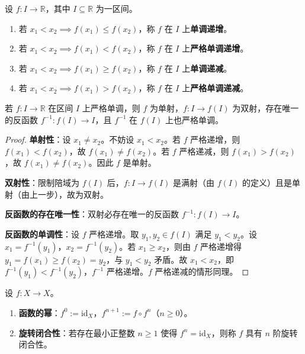 \begin{definition}\label{def:monotonicity}
设 $f: I \to \mathbb{R}$，其中 $I \subseteq \mathbb{R}$ 为一区间。
\begin{enumerate}[label=(\roman*)]
    \item 若 $x_1 < x_2 \implies f(x_1) \le f(x_2)$，称 $f$ 在 $I$ 上\textbf{单调递增}。
    \item 若 $x_1 < x_2 \implies f(x_1) < f(x_2)$，称 $f$ 在 $I$ 上\textbf{严格单调递增}。
    \item 若 $x_1 < x_2 \implies f(x_1) \ge f(x_2)$，称 $f$ 在 $I$ 上\textbf{单调递减}。
    \item 若 $x_1 < x_2 \implies f(x_1) > f(x_2)$，称 $f$ 在 $I$ 上\textbf{严格单调递减}。
\end{enumerate}
\end{definition}

\begin{proposition}[严格单调函数的反函数存在性]\label{prop:strict_monotone_inverse}
若 $f: I \to \mathbb{R}$ 在区间 $I$ 上严格单调，则 $f$ 为单射，$f: I \to f(I)$ 为双射，存在唯一的反函数 $f^{-1}: f(I) \to I$，且 $f^{-1}$ 在 $f(I)$ 上也严格单调。
\end{proposition}

\begin{proof}
\textbf{单射性}：设 $x_1 \neq x_2$。不妨设 $x_1 < x_2$。若 $f$ 严格递增，则 $f(x_1) < f(x_2)$，故 $f(x_1) \neq f(x_2)$。若 $f$ 严格递减，则 $f(x_1) > f(x_2)$，故 $f(x_1) \neq f(x_2)$。因此 $f$ 是单射。

\textbf{双射性}：限制陪域为 $f(I)$ 后，$f: I \to f(I)$ 是满射（由 $f(I)$ 的定义）且是单射（由上一步），故为双射。

\textbf{反函数的存在唯一性}：双射必存在唯一的反函数 $f^{-1}: f(I) \to I$。

\textbf{反函数的单调性}：设 $f$ 严格递增。取 $y_1, y_2 \in f(I)$ 满足 $y_1 < y_2$。设 $x_1 = f^{-1}(y_1)$，$x_2 = f^{-1}(y_2)$。若 $x_1 \ge x_2$，则由 $f$ 严格递增得 $y_1 = f(x_1) \ge f(x_2) = y_2$，与 $y_1 < y_2$ 矛盾。故 $x_1 < x_2$，即 $f^{-1}(y_1) < f^{-1}(y_2)$，$f^{-1}$ 严格递增。$f$ 严格递减的情形同理。
\end{proof}

\begin{definition}\label{def:rotation_composition}
设 $f: X \to X$。
\begin{enumerate}[label=(\roman*)]
    \item \textbf{函数的幂}：$f^0 := \text{id}_X$，$f^{n+1} := f \circ f^n$（$n \ge 0$）。
    \item \textbf{旋转闭合性}：若存在最小正整数 $n \ge 1$ 使得 $f^n = \text{id}_X$，则称 $f$ 具有 $n$ 阶旋转闭合性。
\end{enumerate}
\end{definition}

